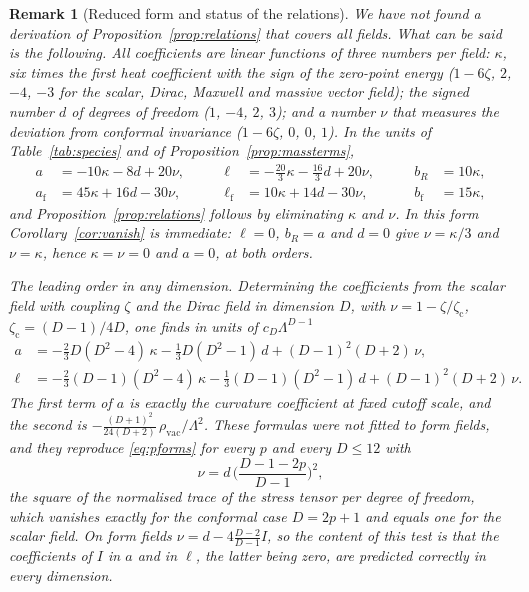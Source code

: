 \documentclass[11pt,a4paper]{article}
\theoremstyle{stmt}
\theoremstyle{defn}
\theoremstyle{rmk}
\newtheorem{remark}[theorem]{Remark}
\numberwithin{equation}{section}
\begin{document}
\begin{remark}[Reduced form and status of the relations]\label{rem:reduced}
We have not found a derivation of Proposition~\ref{prop:relations} that covers all fields. What can be said is the following. All coefficients are linear functions of three numbers per field: $\kappa$, six times the first heat coefficient with the sign of the zero-point energy ($1-6\zeta$, $2$, $-4$, $-3$ for the scalar, Dirac, Maxwell and massive vector field); the signed number $d$ of degrees of freedom ($1$, $-4$, $2$, $3$); and a number $\nu$ that measures the deviation from conformal invariance ($1-6\zeta$, $0$, $0$, $1$). In the units of Table~\ref{tab:species} and of Proposition~\ref{prop:massterms},
\begin{equation}\label{eq:reduced}
\begin{aligned}
a&=-10\kappa-8d+20\nu,&\qquad\ell&=-\tfrac{20}{3}\kappa-\tfrac{16}{3}d+20\nu,&\qquad b_R&=10\kappa,\\
a_{\mathrm f}&=45\kappa+16d-30\nu,&\qquad\ell_{\mathrm f}&=10\kappa+14d-30\nu,&\qquad b_{\mathrm f}&=15\kappa,
\end{aligned}
\end{equation}
and Proposition~\ref{prop:relations} follows by eliminating $\kappa$ and $\nu$. In this form Corollary~\ref{cor:vanish} is immediate: $\ell=0$, $b_R=a$ and $d=0$ give $\nu=\kappa/3$ and $\nu=\kappa$, hence $\kappa=\nu=0$ and $a=0$, at both orders.

\emph{The leading order in any dimension.} Determining the coefficients from the scalar field with coupling $\zeta$ and the Dirac field in dimension $D$, with $\nu=1-\zeta/\zeta_{\mathrm c}$, $\zeta_{\mathrm c}=(D-1)/4D$, one finds in units of $c_D\Lambda^{D-1}$
\begin{equation}\label{eq:reducedD}
\begin{aligned}
a&=-\tfrac23D(D^2-4)\,\kappa-\tfrac13D(D^2-1)\,d+(D-1)^2(D+2)\,\nu,\\
\ell&=-\tfrac23(D-1)(D^2-4)\,\kappa-\tfrac13(D-1)(D^2-1)\,d+(D-1)^2(D+2)\,\nu .
\end{aligned}
\end{equation}
The first term of $a$ is exactly the curvature coefficient at fixed cutoff scale, and the second is $-\frac{(D+1)^2}{24(D+2)}\,\rho_{\mathrm{vac}}/\Lambda^2$. These formulas were not fitted to form fields, and they reproduce \eqref{eq:pforms} for every $p$ and every $D\le12$ with
\[
\nu=d\,\Big(\frac{D-1-2p}{D-1}\Big)^2,
\]
the square of the normalised trace of the stress tensor per degree of freedom, which vanishes exactly for the conformal case $D=2p+1$ and equals one for the scalar field. On form fields $\nu=d-4\tfrac{D-2}{D-1}I$, so the content of this test is that the coefficients of $I$ in $a$ and in $\ell$, the latter being zero, are predicted correctly in every dimension.


\end{remark}
\end{document}
